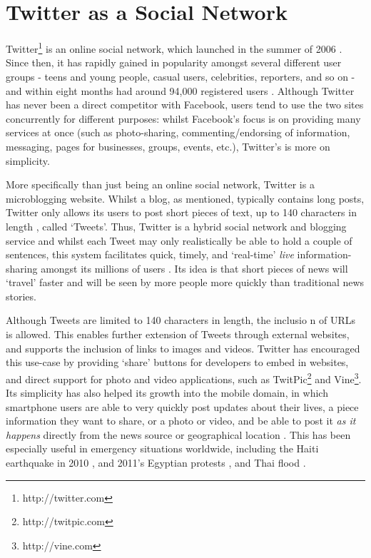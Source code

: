 \section{Twitter as a Social Network}
Twitter\footnote{http://twitter.com} is an online social network, which launched in the summer of 2006 \cite{krishnamurthy08}. Since then, it has rapidly gained in popularity amongst several different user groups - teens and young people, casual users, celebrities, reporters, and so on - and within eight months had around 94,000 registered users \cite{java07}. Although Twitter has never been a direct competitor with Facebook, users tend to use the two sites concurrently for different purposes: whilst Facebook's focus is on providing many services at once (such as photo-sharing, commenting/endorsing of information, messaging, pages for businesses, groups, events, etc.), Twitter's is more on simplicity.

More specifically than just being an online social network, Twitter is a microblogging website. Whilst a blog, as mentioned, typically contains long posts, Twitter only allows its users to post short pieces of text, up to 140 characters in length \cite{krishnamurthy08} \cite{huberman08}, called `Tweets'. Thus, Twitter is a hybrid social network and blogging service and whilst each Tweet may only realistically be able to hold a couple of sentences, this system facilitates quick, timely, and `real-time' \textit{live} information-sharing amongst its millions of users \cite{zhao09}. Its idea is that short pieces of news will `travel' faster and will be seen by more people more quickly than traditional news stories.

Although Tweets are limited to 140 characters in length, the inclusio n of URLs is allowed. This enables further extension of Tweets through external websites, and supports the inclusion of links to images and videos. Twitter has encouraged this use-case by providing `share' buttons for developers to embed in websites, and direct support for photo and video applications, such as TwitPic\footnote{http://twitpic.com} and Vine\footnote{http://vine.com}.\\
Its simplicity has also helped its growth into the mobile domain, in which smartphone users are able to very quickly post updates about their lives, a piece information they want to share, or a photo or video, and be able to post it \textit{as it happens} directly from the news source or geographical location \cite{castillo11}. This has been especially useful in emergency situations worldwide, including the Haiti earthquake in 2010 \cite{muralidharan11}, and 2011's Egyptian protests \cite{wilson11}, and Thai flood \cite{kongthon12}.


